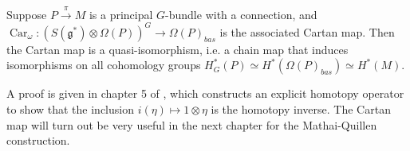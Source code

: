 \begin{thm}[Cartan] %
	Suppose $P\xrightarrow{\pi}M$ is a principal $G$-bundle with a connection, 
	and $\operatorname{Car}_{\omega} : (S(\mathfrak{g}^*) \otimes \Omega(P))^G 
	\to \Omega(P)_{bas}$ is the associated  Cartan map. Then the Cartan map 
	is a quasi-isomorphism, i.e. a chain map that
	induces isomorphisms on all cohomology groups
	$H_G^*(P)\simeq H^*(\Omega(P)_{bas}) \simeq H^*(M)$.
	\begin{comment}
	\[\begin{tikzcd}[column sep = 3.5em]
			{W(\mathfrak{g})\otimes\Omega(P)} & {\Omega(P)} \\
				{(S(\mathfrak{g}^*)\otimes\Omega(P))^G} &
				{\Omega(P)_{\text{bas}}} &[-4.1em] {\simeq\Omega(M)}
					\arrow[from=1-1, to=2-1]
						\arrow[from=1-2, to=2-2]
							\arrow["w", from=1-1, to=1-2]
							\arrow["\operatorname{Hor}\circ w", from=2-1, to=2-2]
			\end{tikzcd}\]
	\end{comment}
\end{thm}
A proof is given in chapter 5 of \citet{guillemin}, which constructs an explicit
homotopy operator to show that the inclusion $i(\eta) \mapsto 1\otimes \eta$ is
the homotopy inverse.
The Cartan map will turn out be very useful in the next chapter for the
Mathai-Quillen construction.



\begin{comment}
	
\section{BRST Model}
In the context of topological field theories, another model of equivariant
cohomlogy arises naturally, called the BRST model. As a vector space, it is
identical to the Weil model $W(\mathfrak{g})\otimes \Omega(M)$, but with
differential $d_B = d_W + \theta^i\otimes \mathcal{L}_i - u^i \otimes \iota_i$.

It was shown by Kalkman that the BRST and Weil models are related by the algebra
automorphism of conjugation by $\exp (\theta^i \iota_i)$. 

\end{comment}

